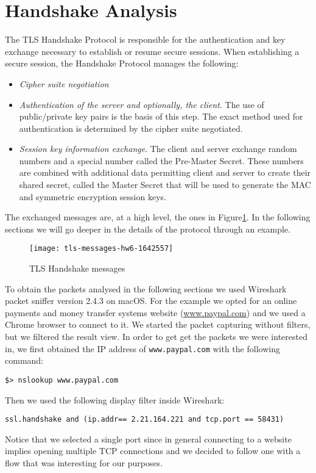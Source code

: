 \documentclass[11pt]{article}
\begin{document}
\section{Handshake Analysis}
The TLS Handshake Protocol is responsible for the authentication and key exchange necessary to establish or resume secure sessions. When establishing a secure session, the Handshake Protocol manages the following:
\begin{itemize}
\item \emph{Cipher suite negotiation}
\item \emph{Authentication of the server and optionally, the client}. The use of public/private key pairs is the basis of this step. The exact method used for authentication is determined by the cipher suite negotiated.
\item \emph{Session key information exchange}. The client and server exchange random numbers and a special number called the Pre-Master Secret. These numbers are combined with additional data permitting client and server to create their shared secret, called the Master Secret that will be used to generate the MAC and symmetric encryption session keys.
\end{itemize}

The exchanged messages are, at a high level, the ones in Figure\ref{fig:messages}. In the following sections we will go deeper in the details of the protocol through an example.

\begin{figure}[h]
\texttt{[image: tls-messages-hw6-1642557]}
\centering
\caption{TLS Handshake messages}
\label{fig:messages}
\end{figure}

To obtain the packets analysed in the following sections we used Wireshark packet sniffer version 2.4.3 on macOS. For the example we opted for an online payments and money transfer systems website (\url{www.paypal.com}) and we used a Chrome browser to connect to it.
We started the packet capturing without filters, but we filtered the result view. In order to get get the packets we were interested in, we first obtained the IP address of \texttt{www.paypal.com} with the following command:
\begin{verbatim}
$> nslookup www.paypal.com
\end{verbatim}
Then we used the following display filter inside Wireshark:
\begin{verbatim}
ssl.handshake and (ip.addr== 2.21.164.221 and tcp.port == 58431)
\end{verbatim}
Notice that we selected a single port since in general connecting to a website implies opening multiple TCP connections and we decided to follow one with a flow that was interesting for our purposes.
\end{document}
